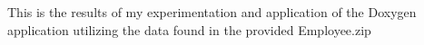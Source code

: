 This is the results of my experimentation and application of the Doxygen application utilizing the data found in the provided Employee.\+zip 